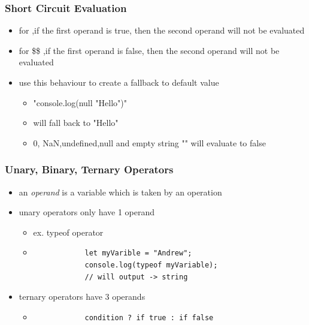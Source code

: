 \documentclass{beamer}
\begin{document}
\begin{frame}
\frametitle{Short Circuit Evaluation}
\begin{itemize}
	\item for \textbar \textbar ,if the first operand is true, then the second operand will not be evaluated
	\item for \$\$ ,if the first operand is false, then the second operand will not be evaluated
	\item use this behaviour to create a fallback to default value
		\begin{itemize}
			\item "console.log(null \textbar "Hello")"
			\item will fall back to "Hello"
			\item 0, NaN,undefined,null and empty string "" will evaluate to false
		\end{itemize}
\end{itemize}
\end{frame}

\begin{frame}[fragile]
\frametitle{Unary, Binary, Ternary Operators}
\begin{itemize}
	\item an \emph{operand} is a variable which is taken by an operation
	\item unary operators only have 1 operand
		\begin{itemize}
			\item ex. typeof operator
			\item \begin{lstlisting}
			let myVarible = "Andrew";
			console.log(typeof myVariable);
			// will output -> string
				\end{lstlisting}
		\end{itemize}
	\item ternary operators have 3 operands
		\begin{itemize}
			\item \begin{lstlisting}
			condition ? if true : if false	
			\end{lstlisting}
		\end{itemize}

\end{itemize}
\end{frame}
\end{document}
